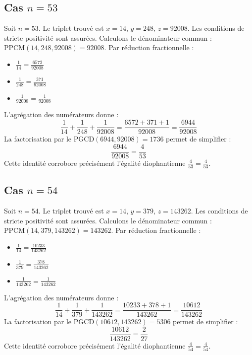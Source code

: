 \documentclass[11pt,a4paper]{article}
\begin{document}
\subsection{Cas $n = 53$}
Soit $n = 53$. Le triplet trouvé est $x = 14$, $y = 248$, $z = 92008$.
Les conditions de stricte positivité sont assurées.
Calculons le dénominateur commun : $\text{PPCM}(14, 248, 92008) = 92008$.
Par réduction fractionnelle :
\begin{itemize}
    \item $\frac{1}{14} = \frac{6572}{92008}$
    \item $\frac{1}{248} = \frac{371}{92008}$
    \item $\frac{1}{92008} = \frac{1}{92008}$
\end{itemize}
L'agrégation des numérateurs donne :
$$ \frac{1}{14} + \frac{1}{248} + \frac{1}{92008} = \frac{6572 + 371 + 1}{92008} = \frac{6944}{92008} $$
La factorisation par le $\text{PGCD}(6944, 92008) = 1736$ permet de simplifier :
$$ \frac{6944}{92008} = \frac{4}{53} $$
Cette identité corrobore précisément l'égalité diophantienne $\frac{4}{53} = \frac{4}{53}$.

\subsection{Cas $n = 54$}
Soit $n = 54$. Le triplet trouvé est $x = 14$, $y = 379$, $z = 143262$.
Les conditions de stricte positivité sont assurées.
Calculons le dénominateur commun : $\text{PPCM}(14, 379, 143262) = 143262$.
Par réduction fractionnelle :
\begin{itemize}
    \item $\frac{1}{14} = \frac{10233}{143262}$
    \item $\frac{1}{379} = \frac{378}{143262}$
    \item $\frac{1}{143262} = \frac{1}{143262}$
\end{itemize}
L'agrégation des numérateurs donne :
$$ \frac{1}{14} + \frac{1}{379} + \frac{1}{143262} = \frac{10233 + 378 + 1}{143262} = \frac{10612}{143262} $$
La factorisation par le $\text{PGCD}(10612, 143262) = 5306$ permet de simplifier :
$$ \frac{10612}{143262} = \frac{2}{27} $$
Cette identité corrobore précisément l'égalité diophantienne $\frac{4}{54} = \frac{4}{54}$.
\end{document}
